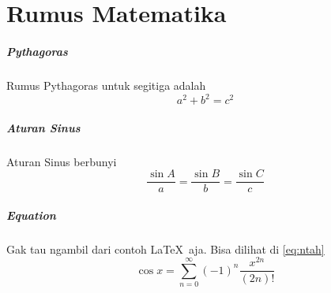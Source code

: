 \chapter{Rumus Matematika}
\paragraph{Pythagoras} Rumus Pythagoras untuk segitiga adalah
$$a^2 + b^2 = c^2$$

\paragraph{Aturan Sinus} Aturan Sinus berbunyi
$$ \frac{\sin A}{a} = \frac{\sin B}{b} = \frac{\sin C}{c}$$

\paragraph{Equation} Gak tau ngambil dari contoh \LaTeX\  aja. Bisa dilihat di \ref{eq:ntah}
\begin{equation}\label{eq:ntah}
    \cos{x} = \sum_{n=0}^{\infty} (-1)^n \frac{x^{2n}}{(2n)!}
\end{equation}